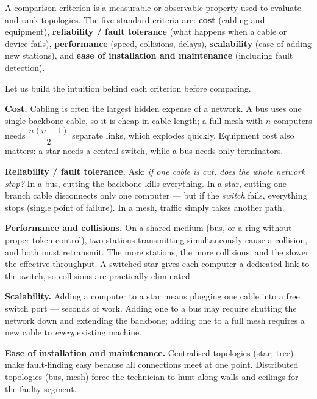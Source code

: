\documentclass[11pt]{article}
\newcommand{\cle}[1]{{\popxbold\color{popdark}#1}}
\newcounter{popsec}
\newcounter{popsub}
\newcommand{\courssub}[1]{%
  \stepcounter{popsub}%
  \par\vspace{9pt}\noindent{\popxbold\fontsize{11.5}{13}\selectfont\color{popink}{\color{poporange}\thepopsec.\thepopsub}\hspace{6pt}#1}\par\nopagebreak\vspace{4pt}
}
\begin{document}
\courssub{Comparison Criteria}

\begin{definition}
A \cle{comparison criterion} is a measurable or observable property used to evaluate and rank topologies. The five standard criteria are: \textbf{cost} (cabling and equipment), \textbf{reliability / fault tolerance} (what happens when a cable or device fails), \textbf{performance} (speed, collisions, delays), \textbf{scalability} (ease of adding new stations), and \textbf{ease of installation and maintenance} (including fault detection).
\end{definition}

Let us build the intuition behind each criterion before comparing.

\textbf{Cost.} Cabling is often the largest hidden expense of a network. A bus uses one single backbone cable, so it is cheap in cable length; a full mesh with $n$ computers needs $\dfrac{n(n-1)}{2}$ separate links, which explodes quickly. Equipment cost also matters: a star needs a central switch, while a bus needs only terminators.

\textbf{Reliability / fault tolerance.} Ask: \emph{if one cable is cut, does the whole network stop?} In a bus, cutting the backbone kills everything. In a star, cutting one branch cable disconnects only one computer --- but if the \emph{switch} fails, everything stops (single point of failure). In a mesh, traffic simply takes another path.

\textbf{Performance and collisions.} On a shared medium (bus, or a ring without proper token control), two stations transmitting simultaneously cause a \cle{collision}, and both must retransmit. The more stations, the more collisions, and the slower the effective throughput. A switched star gives each computer a dedicated link to the switch, so collisions are practically eliminated.

\textbf{Scalability.} Adding a computer to a star means plugging one cable into a free switch port --- seconds of work. Adding one to a bus may require shutting the network down and extending the backbone; adding one to a full mesh requires a new cable to \emph{every} existing machine.

\textbf{Ease of installation and maintenance.} Centralised topologies (star, tree) make fault-finding easy because all connections meet at one point. Distributed topologies (bus, mesh) force the technician to hunt along walls and ceilings for the faulty segment.
\end{document}
